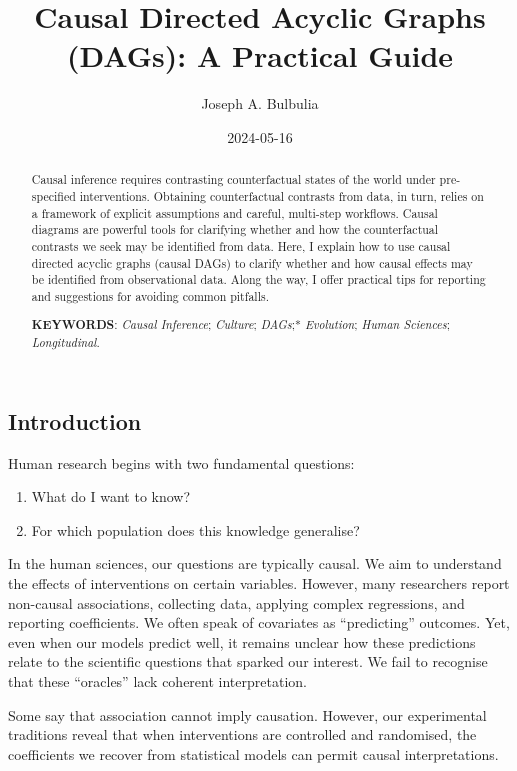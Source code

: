 \documentclass[
  single column]{article}
\title{Causal Directed Acyclic Graphs (DAGs): A Practical Guide}
\author{Joseph A. Bulbulia}
\affil{%
             \small{     Victoria University of Wellington, New Zealand
          ORCID \textcolor[HTML]{A6CE39}{\aiOrcid} ~0000-0002-5861-2056 }
              }
\date{2024-05-16}
\providecommand{\tightlist}{%
  \setlength{\itemsep}{0pt}\setlength{\parskip}{0pt}}\usepackage{longtable,booktabs,array}
\begin{document}
\maketitle
\begin{abstract}
Causal inference requires contrasting counterfactual states of the world
under pre-specified interventions. Obtaining counterfactual contrasts
from data, in turn, relies on a framework of explicit assumptions and
careful, multi-step workflows. Causal diagrams are powerful tools for
clarifying whether and how the counterfactual contrasts we seek may be
identified from data. Here, I explain how to use causal directed acyclic
graphs (causal DAGs) to clarify whether and how causal effects may be
identified from observational data. Along the way, I offer practical
tips for reporting and suggestions for avoiding common pitfalls.

\textbf{KEYWORDS}: \emph{Causal Inference}; \emph{Culture};
\emph{DAGs};* \emph{Evolution}; \emph{Human Sciences};
\emph{Longitudinal}.
\end{abstract}

\subsection{Introduction}\label{introduction}

Human research begins with two fundamental questions:

\begin{enumerate}
\def\labelenumi{\arabic{enumi}.}
\tightlist
\item
  What do I want to know?
\item
  For which population does this knowledge generalise?
\end{enumerate}

In the human sciences, our questions are typically causal. We aim to
understand the effects of interventions on certain variables. However,
many researchers report non-causal associations, collecting data,
applying complex regressions, and reporting coefficients. We often speak
of covariates as ``predicting'' outcomes. Yet, even when our models
predict well, it remains unclear how these predictions relate to the
scientific questions that sparked our interest. We fail to recognise
that these ``oracles'' lack coherent interpretation.

Some say that association cannot imply causation. However, our
experimental traditions reveal that when interventions are controlled
and randomised, the coefficients we recover from statistical models can
permit causal interpretations.
\end{document}
